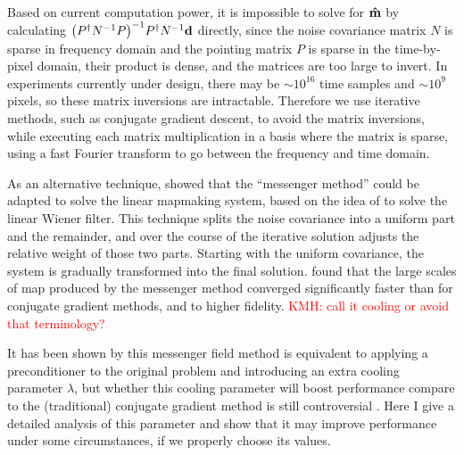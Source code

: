 \documentclass[twocolumn,linenumbers]{aastex631}
\newcommand{\vbd}{\vb{d}}
\newcommand{\vbm}{\vb{m}}
\newcommand{\vbn}{\vb{n}}
\newcommand{\inv}[1]{#1^{-1}}
\newcommand{\hatm}{\vb{\hat{m}}}
\newcommand{\Pdagger}{P^{\dagger}}
\newcommand{\PPinv}[1]{\inv{\qty(\Pdagger #1 P)}}
\newcommand{\kmh}[1]{\textcolor{red}{KMH: #1}}
\begin{document}
Based on current computation power, it is impossible to solve for $\hatm$
by calculating $\PPinv{\inv{N}} \Pdagger \inv{N} \vbd$ directly,
since the noise covariance matrix $N$ is sparse in frequency domain
and the pointing matrix $P$ is sparse in the time-by-pixel domain, their product is dense, and the matrices are too large to invert.   In experiments currently under design, there may be $\sim 10^{16}$ time samples
and $\sim 10^{9}$ pixels, so these matrix inversions are intractable.
Therefore we use iterative methods, such as conjugate gradient descent, to avoid the matrix inversions, while executing each matrix multiplication in a basis where the matrix is sparse, using a fast Fourier transform to go between the frequency and time domain.

As an alternative technique, \citet{Huffenberger_2018} showed that the ``messenger method'' could be adapted to solve the linear mapmaking system, based on the  idea of \cite{2013A&A...549A.111E} to solve the linear Wiener filter.  This technique splits the noise covariance into a uniform part and the remainder, and over the course of the iterative solution adjusts the relative weight of those two parts.  Starting with the uniform covariance, the system is gradually transformed into the final solution.  \citet{Huffenberger_2018} found that the large scales of map produced by the messenger method converged significantly faster than for conjugate gradient methods, and to higher fidelity.  \kmh{call it cooling or avoid that terminology?}


It has been shown by \cite{2018A&A...620A..59P} this messenger field method
is equivalent to applying a preconditioner to the original problem and 
introducing an extra cooling parameter $\lambda$,
but whether this cooling parameter will boost performance compare to
 the (traditional) conjugate gradient method is still controversial . 
Here I give a detailed analysis of this parameter and show that
it may improve performance under some circumstances, if we properly choose
its values.




\end{document}
